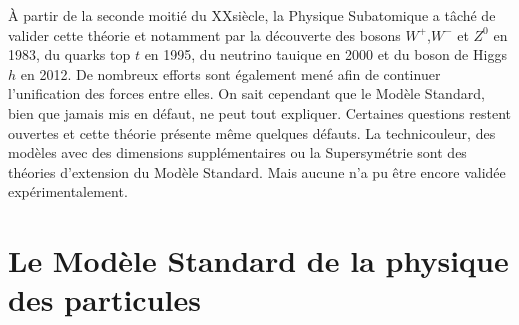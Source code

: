 À partir de la seconde moitié du XX\ieme siècle, la Physique Subatomique a tâché de valider cette théorie et notamment par la découverte des bosons  $W^{+}$,$W^{-}$ et $Z^{0}$ en 1983, du quarks top $t$ en 1995, du neutrino tauique en 2000 et du boson de Higgs $h$ en 2012. De nombreux efforts sont également mené afin de continuer l'unification des forces entre elles. On sait cependant que le Modèle Standard, bien que jamais mis en défaut, ne peut tout expliquer. Certaines questions restent ouvertes et cette théorie présente même quelques défauts. La technicouleur, des modèles avec des dimensions supplémentaires ou la Supersymétrie sont des théories d'extension du Modèle Standard. Mais aucune n'a pu être encore validée expérimentalement.

\section{Le Modèle Standard de la physique des particules}
 
